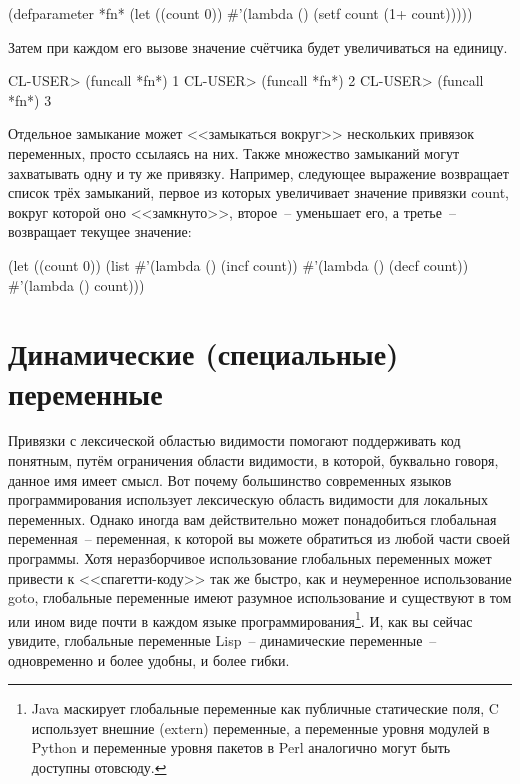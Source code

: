 \begin{myverb}
(defparameter *fn* (let ((count 0)) #'(lambda () (setf count (1+ count)))))
\end{myverb}

Затем при каждом его вызове значение счётчика будет увеличиваться на единицу.

\begin{myverb}
CL-USER> (funcall *fn*)
1
CL-USER> (funcall *fn*)
2
CL-USER> (funcall *fn*)
3
\end{myverb}

Отдельное замыкание может <<замыкаться вокруг>> нескольких привязок переменных, просто
ссылаясь на них. Также множество замыканий могут захватывать одну и ту же
привязку. Например, следующее выражение возвращает список трёх замыканий, первое из
которых увеличивает значение привязки count, вокруг которой оно <<замкнуто>>, второе~--
уменьшает его, а третье~-- возвращает текущее значение:

\begin{myverb}
(let ((count 0))
  (list
   #'(lambda () (incf count))
   #'(lambda () (decf count))
   #'(lambda () count)))
\end{myverb}

\section{Динамические (специальные) переменные}

Привязки с лексической областью видимости помогают поддерживать код понятным, путём
ограничения области видимости, в которой, буквально говоря, данное имя имеет смысл. Вот
почему большинство современных языков программирования использует лексическую область
видимости для локальных переменных. Однако иногда вам действительно может понадобиться
глобальная переменная~-- переменная, к которой вы можете обратиться из любой части своей
программы. Хотя неразборчивое использование глобальных переменных может привести к
<<спагетти-коду>> так же быстро, как и неумеренное использование goto, глобальные переменные
имеют разумное использование и существуют в том или ином виде почти в каждом языке
программирования\footnote{Java маскирует глобальные переменные как публичные статические
  поля, C использует внешние (extern) переменные, а переменные уровня модулей в Python и
  переменные уровня пакетов в Perl аналогично могут быть доступны отовсюду.}. И, как вы
сейчас увидите, глобальные переменные Lisp~-- динамические переменные~-- одновременно и
более удобны, и более гибки.

